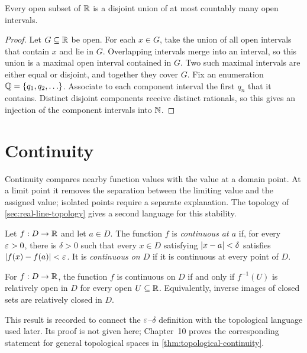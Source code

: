 \begin{proposition}
\label{prop:real-open-interval-components}
Every open subset of $\mathbb{R}$ is a disjoint union of at most countably many
open intervals.
\end{proposition}
\begin{proof}
Let $G\subseteq\mathbb{R}$ be open.  For each $x\in G$, take the union of all open
intervals that contain $x$ and lie in $G$.  Overlapping intervals merge
into an interval, so this union is a maximal open interval contained in
$G$. Two such maximal intervals are either equal or disjoint, and together
they cover $G$. Fix an enumeration $\mathbb{Q}=\{q_1,q_2,\ldots\}$. Associate to
each component interval the first $q_n$ that it contains. Distinct disjoint
components receive distinct rationals, so this gives an injection of the
component intervals into $\mathbb{N}$.
\end{proof}

\section{Continuity}

Continuity compares nearby function values with the value at a domain point.
At a limit point it removes the separation between the limiting value and
the assigned value; isolated points require a separate explanation.  The
topology of \cref{sec:real-line-topology} gives a second language for this
stability.

\begin{definition}[Continuity]
\label{def:continuity}
Let $f:D\to\mathbb{R}$ and let $a\in D$. The function $f$ is \emph{continuous at $a$} if, for every $\varepsilon>0$, there is $\delta>0$ such that every $x\in D$ satisfying $\lvert x-a\rvert<\delta$ satisfies $\lvert f(x)-f(a)\rvert<\varepsilon$. It is \emph{continuous on $D$} if it is continuous at every point of $D$.
\end{definition}

\begin{theorem}
\label{thm:real-open-set-continuity}
For $f:D\to\mathbb{R}$, the function $f$ is continuous on $D$ if and only if
$f^{-1}(U)$ is relatively open in $D$ for every open $U\subseteq\mathbb{R}$.
Equivalently, inverse images of closed sets are relatively closed in $D$.
\end{theorem}
This result is recorded to connect the $\varepsilon$--$\delta$ definition with the
topological language used later. Its proof is not given here; Chapter~10
proves the corresponding statement for general topological spaces in
\cref{thm:topological-continuity}.

